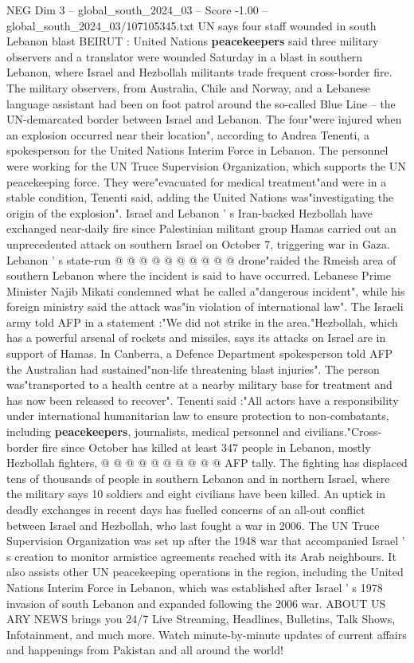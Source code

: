 \begin{textsample}{NEG Dim 3 – global\_south\_2024\_03 – Score -1.00 – global\_south\_2024\_03/107105345.txt}  \label{ex:f3_neg_031}
UN says four staff wounded in south Lebanon blast BEIRUT : United Nations \textbf{peacekeepers} said three military observers and a translator were wounded Saturday in a blast in southern Lebanon, where Israel and Hezbollah militants trade frequent cross-border fire.
The military observers, from Australia, Chile and Norway, and a Lebanese language assistant had been on foot patrol around the so-called Blue Line -- the UN-demarcated border between Israel and Lebanon.
The four"were injured when an explosion occurred near their location", according to Andrea Tenenti, a spokesperson for the United Nations Interim Force in Lebanon.
The personnel were working for the UN Truce Supervision Organization, which supports the UN peacekeeping force.
They were"evacuated for medical treatment"and were in a stable condition, Tenenti said, adding the United Nations was"investigating the origin of the explosion".
Israel and Lebanon ' s Iran-backed Hezbollah have exchanged near-daily fire since Palestinian militant group Hamas carried out an unprecedented attack on southern Israel on October 7, triggering war in Gaza.
Lebanon ' s state-run @ @ @ @ @ @ @ @ @ @ drone"raided the Rmeish area of southern Lebanon where the incident is said to have occurred.
Lebanese Prime Minister Najib Mikati condemned what he called a"dangerous incident", while his foreign ministry said the attack was"in violation of international law".
The Israeli army told AFP in a statement :"We did not strike in the area."Hezbollah, which has a powerful arsenal of rockets and missiles, says its attacks on Israel are in support of Hamas.
In Canberra, a Defence Department spokesperson told AFP the Australian had sustained"non-life threatening blast injuries".
The person was"transported to a health centre at a nearby military base for treatment and has now been released to recover".
Tenenti said :"All actors have a responsibility under international humanitarian law to ensure protection to non-combatants, including \textbf{peacekeepers}, journalists, medical personnel and civilians."Cross-border fire since October has killed at least 347 people in Lebanon, mostly Hezbollah fighters, @ @ @ @ @ @ @ @ @ @ AFP tally.
The fighting has displaced tens of thousands of people in southern Lebanon and in northern Israel, where the military says 10 soldiers and eight civilians have been killed.
An uptick in deadly exchanges in recent days has fuelled concerns of an all-out conflict between Israel and Hezbollah, who last fought a war in 2006.
The UN Truce Supervision Organization was set up after the 1948 war that accompanied Israel ' s creation to monitor armistice agreements reached with its Arab neighbours.
It also assists other UN peacekeeping operations in the region, including the United Nations Interim Force in Lebanon, which was established after Israel ' s 1978 invasion of south Lebanon and expanded following the 2006 war.
ABOUT US ARY NEWS brings you 24/7 Live Streaming, Headlines, Bulletins, Talk Shows, Infotainment, and much more.
Watch minute-by-minute updates of current affairs and happenings from Pakistan and all around the world!

\end{textsample}
